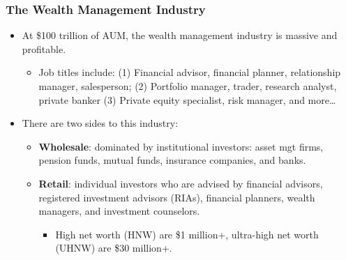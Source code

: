 \begin{frame}
\frametitle{The Wealth Management Industry}


\vspace{-2mm}
\begin{itemize}
    \item At \$100 trillion of AUM, the wealth management industry is massive and profitable.
    \begin{itemize}
        \item Job titles include: (1) Financial advisor, financial planner, relationship manager, salesperson; (2) Portfolio manager, trader, research analyst, private banker (3) Private equity specialist, risk manager, and more…
    \end{itemize}
 

    \item There are two sides to this industry:

    \begin{itemize}
        \item \textbf{Wholesale}: dominated by institutional investors: asset mgt firms, pension funds, mutual funds, insurance companies, and banks.
        

        \item \textbf{Retail}: individual investors who are advised by financial advisors, registered investment advisors (RIAs), financial planners, wealth managers, and investment counselors.
        \begin{itemize}
            \item High net worth (HNW) are \$1 million+, ultra-high net worth (UHNW) are \$30 million+.
        \end{itemize}
    \end{itemize}
\end{itemize}




\end{frame} 





